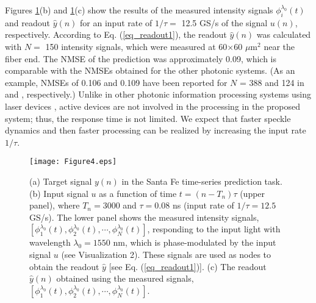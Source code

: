 \documentclass{article}
\begin{document}
Figures \ref{fig4}(b) and \ref{fig4}(c) show the results of the measured intensity signals $\phi_i^{\lambda_0}(t)$ 
and readout $\hat{y}(n)$ for an input rate of  
$1/\tau =$ 12.5 GS/s of the signal $u(n)$, respectively. 
%
According to Eq. (\ref{eq_readout1}), the readout $\hat{y}(n)$ was
calculated with $N =$ 150 intensity signals, which were 
measured at 60$\times$60 $\mu$m$^2$ near the fiber end.
%
The NMSE of the prediction was approximately 0.09, which is comparable with
the NMSEs obtained for the other photonic systems. (As an example, NMSEs of 0.106 and 0.109 have been reported for $N$ = 388 and 124 in \cite{Brunner2013} and \cite{Takano2018}, respectively.) 
%
Unlike in other photonic information processing systems 
using laser devices \cite{Brunner2013,Takano2018},  
active devices are not involved in the processing in the proposed system; thus, 
the response time is not limited.
%
We expect that faster speckle dynamics and then faster processing can be realized 
by increasing the input rate $1/\tau$.

%
\begin{figure}[htbp]
\centering\texttt{[image: Figure4.eps]}
\caption{\label{fig4}
(a) Target signal $y(n)$ in the Santa Fe time-series prediction task. 
(b) Input signal $u$ as a function of time $t = (n-T_n)\tau$ (upper panel), 
where $T_n=3000$ and $\tau = 0.08$ ns (input rate of $1/\tau=12.5$ GS/s).  
%
The lower panel shows the measured intensity signals,
 $[\phi_1^{\lambda_0}(t),\phi_2^{\lambda_0}(t),\cdots,\phi_N^{\lambda_0}(t)]$,
responding to the input light with wavelength $\lambda_0=1550$ nm, which
 is phase-modulated by the input signal $u$ (see Visualization
 2). These signals are used as nodes to obtain the readout $\hat{y}$
 [see Eq. (\ref{eq_readout1})].  
% 
(c) The readout $\hat{y}(n)$ obtained using the measured 
signals, $[\phi_1^{\lambda_0}(t),\phi_2^{\lambda_0}(t),\cdots,\phi_N^{\lambda_0}(t)]$.
%
}
\end{figure}
%
\end{document}
